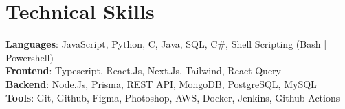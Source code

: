 \section{Technical Skills}
 \begin{itemize}[leftmargin=0.15in, label={}]
    \small{\item{
     \textbf{Languages}{: JavaScript, Python, C, Java, SQL, C\#, Shell Scripting (Bash | Powershell)} \\
     \textbf{Frontend}{: Typescript, React.Js, Next.Js, Tailwind, React Query} \\
     \textbf{Backend}{: Node.Js, Prisma, REST API, MongoDB, PostgreSQL, MySQL} \\
     \textbf{Tools}{: Git, Github, Figma, Photoshop, AWS, Docker, Jenkins, Github Actions} \\
    }}
 \end{itemize}
 \vspace{-14pt}
